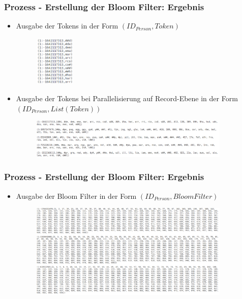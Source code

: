\documentclass{beamer}
\begin{document}
    \begin{frame}
    		\frametitle{Prozess - Erstellung der Bloom Filter: Ergebnis}
    		\begin{itemize}
    			\item Ausgabe der Tokens in der Form $(ID_{Person}, Token)$
    				\begin{figure}[H]
    					\includegraphics[width=0.18\textwidth]{graphics/tokens_1.png}
    				\end{figure}
    			\item Ausgabe der Tokens bei Parallelisierung auf Record-Ebene in der Form
    			$(ID_{Person}, List(Token))$
    				\begin{figure}[H]
    					\includegraphics[width=0.9\textwidth]{graphics/tokens_2.png}
    				\end{figure}
    		\end{itemize}
    \end{frame}
   
    \begin{frame}
    		\frametitle{Prozess - Erstellung der Bloom Filter: Ergebnis}
    		\begin{itemize}
    			\item Ausgabe der Bloom Filter in der Form $(ID_{Person}, BloomFilter)$
    				\begin{figure}[H]
    					\includegraphics[width=0.9\textwidth]{graphics/bloomfilter.png}
    				\end{figure}
    		\end{itemize}
    \end{frame}
\end{document}
